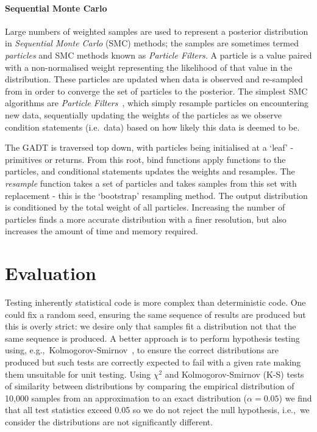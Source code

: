 \documentclass[sigconf]{acmart}
\begin{document}
\paragraph{Sequential Monte Carlo}
Large numbers of weighted samples are used to represent a posterior distribution in \emph{Sequential Monte Carlo} (SMC) methods; the samples are sometimes termed \emph{particles} and SMC methods known as \emph{Particle Filters.} A particle is a value paired with a non-normalised weight representing the likelihood of that value in the distribution. These particles are updated when data is observed and re-sampled from in order to converge the set of particles to the posterior. The simplest SMC algorithms are \emph{Particle Filters}~\cite{particlefilter}, which simply resample particles on encountering new data, sequentially updating the weights of the particles as we observe condition statements (i.e.~data) based on how likely this data is deemed to be.

The GADT is traversed top down, with particles being initialised at a `leaf' - primitives or returns. From this root, bind functions apply functions to the particles, and conditional statements updates the weights and resamples. The \emph{resample} function takes a set of particles and takes samples from this set with replacement - this is the `bootstrap' resampling method. The output distribution is conditioned by the total weight of all particles. Increasing the number of particles finds a more accurate distribution with a finer resolution, but also increases the amount of time and memory required.

\section{Evaluation}
\label{s:evaluation}

Testing inherently statistical code is more complex than deterministic code. One could fix a random seed, ensuring the same sequence of results are produced but this is overly strict: we desire only that samples fit a distribution not that the same sequence is produced. A better approach is to perform hypothesis testing using, e.g.,~Kolmogorov-Smirnov~\cite{massey1951kolmogorov}, to ensure the correct distributions are produced but such tests are correctly expected to fail with a given rate making them unsuitable for unit testing. Using $\chi^2$ and Kolmogorov-Smirnov (K-S) tests of similarity between distributions by comparing the empirical distribution of 10,000 samples from an approximation to an exact distribution ($\alpha = 0.05$) we find that all test statistics exceed 0.05 so we do not reject the null hypothesis, i.e.,~we consider the distributions are not significantly different.
\end{document}
